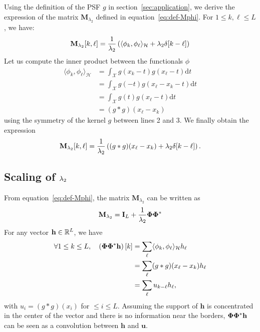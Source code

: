     Using the definition of the PSF $g$ in section~\ref{sec:application}, we derive the expression of the matrix $\mathbf{M}_{\lambda_2}$ defined in equation~\eqref{eq:def-Mphi}. For $1\leq k, \ell \leq L$, we have:
    \begin{equation*}
        \mathbf{M}_{\lambda_{2}}[k, \ell] = \frac{1}{\lambda_{2}} \left( \langle \phi_k , \phi_\ell \rangle_{\mathcal{H}} + \lambda_{2} \delta[k - \ell] \right)
    \end{equation*}
    Let us compute the inner product between the functionals $\phi$
    \begin{equation*}
        \begin{aligned}
            \langle \phi_k , \phi_\ell \rangle_{\mathcal{H}} &= \int_\mathcal{X} g(x_k - t) g(x_\ell - t) \mathrm{d}t \\
                &= \int_\mathcal{X} g(- t) g(x_\ell - x_k - t) \mathrm{d}t \\
                &= \int_\mathcal{X} g(t) g(x_\ell - t) \mathrm{d}t \\
                &=  (g * g)(x_\ell - x_k)
        \end{aligned}
    \end{equation*}
    using the symmetry of the kernel $g$ between lines 2 and 3.
    We finally obtain the expression
    \begin{equation*}
        \label{eq:mlambda-1d}
        \mathbf{M}_{\lambda_2}[k, \ell] = \frac{1}{\lambda_{2}} \left( (g * g)(x_\ell - x_k) + \lambda_{2} \delta [k - \ell] \right) .
    \end{equation*}

    \subsection{Scaling of \texorpdfstring{$\lambda_{2}$}{lambda 2}}
    From equation~\eqref{eq:def-Mphi}, the matrix $\mathbf{M}_{\lambda_2}$ can be written as
    \begin{equation}
        \label{eq:mlambda2}
        \mathbf{M}_{\lambda_{2}} = \mathbf{I}_L +  \frac{1}{\lambda_{2}}\bm{\Phi}\bm{\Phi}^*
    \end{equation}
    For any vector $\mathbf{h} \in \mathbb{R}^L$, we have
    \begin{align*}
        \forall 1 \leq k \leq L, \quad \left(\bm{\Phi}\bm{\Phi}^*\mathbf{h}\right)[k] &= \sum_\ell \langle \phi_k , \phi_\ell \rangle_{\mathcal{H}} h_\ell \\
            &= \sum_\ell (g * g)(x_\ell - x_k) h_\ell \\
            &= \sum_\ell u_{k - \ell} h_\ell,
    \end{align*}
    with $u_i = (g * g)(x_i)$ for $ \leq i \leq L$. Assuming the support of $\mathbf{h}$ is concentrated in the center of the vector and there is no information near the borders, $\bm{\Phi}\bm{\Phi}^*\mathbf{h}$ can be seen as a convolution between $\mathbf{h}$ and $\mathbf{u}$.

